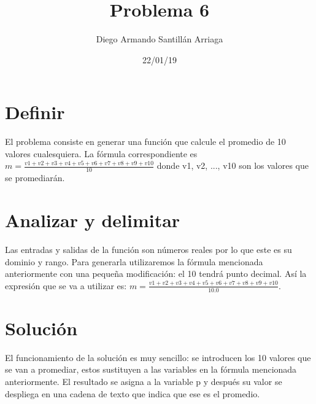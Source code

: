 \documentclass[letterpaper, 12pt, oneside]{article}%
\title{\Huge Problema 6}
\author{Diego Armando Santillán Arriaga}
\date{22/01/19}
\begin{document}
\maketitle
\newpage
\section*{Definir}
El problema consiste en generar una función que calcule el promedio de 10 valores cualesquiera. La fórmula correspondiente es $ m = \frac{v1+v2+v3+v4+v5+v6+v7+v8+v9+v10}{10} $ donde v1, v2, ..., v10 son los valores que se promediarán.
\section*{Analizar y delimitar}
Las entradas y salidas de la función son números reales por lo que este es su dominio y rango.
Para generarla utilizaremos la fórmula mencionada anteriormente con una pequeña modificación: el 10 tendrá punto decimal. Así la expresión que se va a utilizar es: $ m = \frac{v1+v2+v3+v4+v5+v6+v7+v8+v9+v10}{10.0} $.  
\section*{Solución}
El funcionamiento de la solución es muy sencillo: 
se introducen los 10 valores que se van a promediar, estos sustituyen a las variables en la fórmula mencionada anteriormente. El resultado se asigna a la variable p y después su valor se despliega en una cadena de texto que indica que ese es el promedio. 
\end{document}
